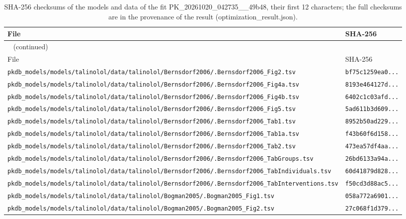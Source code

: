 \documentclass{article}
\begin{document}
\begin{longtable}{ll}
\caption{SHA-256 checksums of the models and data of the fit PK\_20261020\_042735\_\_49b48, their first 12 characters; the full checksums are in the provenance of the result (optimization\_result.json).}\label{tab:checksums:PK_20261020_042735__49b48} \\
\toprule
File & SHA-256 \\
\midrule
\endfirsthead
\multicolumn{2}{l}{\small\tablename~\thetable{} (continued)} \\
\toprule
File & SHA-256 \\
\midrule
\endhead
\bottomrule
\endlastfoot
\texttt{pkdb\_models/models/talinolol/data/talinolol/Bernsdorf2006/.Bernsdorf2006\_Fig2.tsv} & \texttt{bf75c1259ea0...} \\
\texttt{pkdb\_models/models/talinolol/data/talinolol/Bernsdorf2006/.Bernsdorf2006\_Fig4a.tsv} & \texttt{8193e464127d...} \\
\texttt{pkdb\_models/models/talinolol/data/talinolol/Bernsdorf2006/.Bernsdorf2006\_Fig4b.tsv} & \texttt{6402c1c03afd...} \\
\texttt{pkdb\_models/models/talinolol/data/talinolol/Bernsdorf2006/.Bernsdorf2006\_Fig5.tsv} & \texttt{5ad611b3d609...} \\
\texttt{pkdb\_models/models/talinolol/data/talinolol/Bernsdorf2006/.Bernsdorf2006\_Tab1.tsv} & \texttt{8952b50ad229...} \\
\texttt{pkdb\_models/models/talinolol/data/talinolol/Bernsdorf2006/.Bernsdorf2006\_Tab1a.tsv} & \texttt{f43b60f6d158...} \\
\texttt{pkdb\_models/models/talinolol/data/talinolol/Bernsdorf2006/.Bernsdorf2006\_Tab2.tsv} & \texttt{473ea57df4aa...} \\
\texttt{pkdb\_models/models/talinolol/data/talinolol/Bernsdorf2006/.Bernsdorf2006\_TabGroups.tsv} & \texttt{26bd6133a94a...} \\
\texttt{pkdb\_models/models/talinolol/data/talinolol/Bernsdorf2006/.Bernsdorf2006\_TabIndividuals.tsv} & \texttt{60d41879d828...} \\
\texttt{pkdb\_models/models/talinolol/data/talinolol/Bernsdorf2006/.Bernsdorf2006\_TabInterventions.tsv} & \texttt{f50cd3d88ac5...} \\
\texttt{pkdb\_models/models/talinolol/data/talinolol/Bogman2005/.Bogman2005\_Fig1.tsv} & \texttt{058a772a6901...} \\
\texttt{pkdb\_models/models/talinolol/data/talinolol/Bogman2005/.Bogman2005\_Fig2.tsv} & \texttt{27c068f1d379...} \\

\end{longtable}
\end{document}
